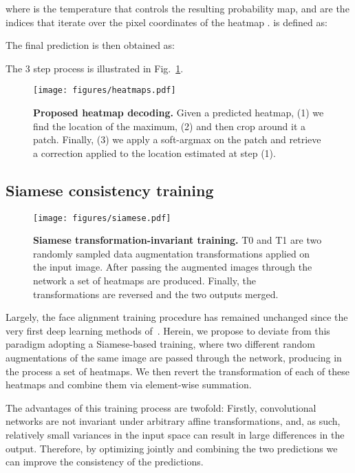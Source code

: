 \documentclass{bmvc2k}
\begin{document}
where  is the temperature that controls the resulting probability map, and  are the indices that iterate over the pixel coordinates of the heatmap .  is defined as: 


The final prediction is then obtained as:

The 3 step process is illustrated in Fig.~\ref{fig:heatmap-decoding}.


\begin{figure}
    \centering
    \texttt{[image: figures/heatmaps.pdf]}
    \caption{\textbf{Proposed heatmap decoding.} Given a predicted heatmap, (1) we find the location of the maximum, (2) and then crop around it a  patch. Finally, (3) we apply a soft-argmax on the patch and retrieve a correction applied to the location estimated at step (1).}
    \label{fig:heatmap-decoding}
    \vspace{-10px}
\end{figure}

\subsection{Siamese consistency training}\label{ssec:siamese}



\begin{figure}[ht!]
    \centering
    \texttt{[image: figures/siamese.pdf]}
    \caption{\textbf{Siamese transformation-invariant training.} T0 and T1 are two randomly sampled data augmentation transformations applied on the input image. After passing the augmented images through the network a set of heatmaps are produced. Finally, the transformations are reversed and the two outputs merged.}
    \label{fig:siamese-training}
    \vspace{-10px}
\end{figure}

Largely, the face alignment training procedure has remained unchanged since the very first deep learning methods of~\cite{bulat2017far,zhu2016face}. Herein, we propose to deviate from this paradigm adopting a Siamese-based training, where two different random augmentations of the same image are passed through the network, producing in the process a set of heatmaps. We then revert the transformation of each of these heatmaps and combine them via element-wise summation.

The advantages of this training process are twofold: Firstly, convolutional networks are not invariant under arbitrary affine transformations, and, as such, relatively small variances in the input space can result in large differences in the output. Therefore, by optimizing jointly and combining the two predictions we can improve the consistency of the predictions.
\end{document}
